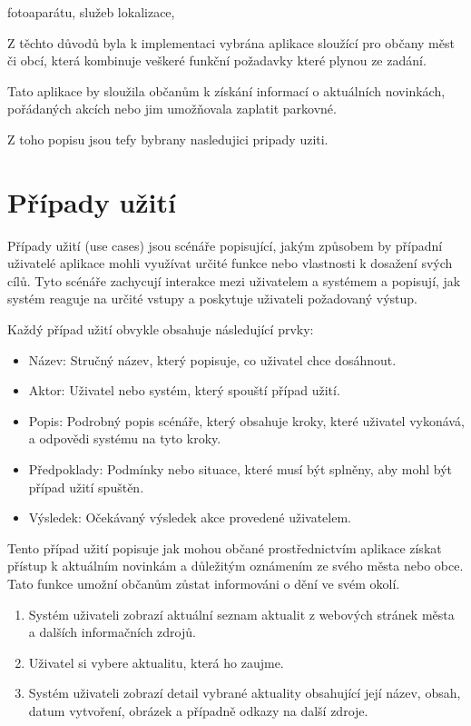 fotoaparátu, služeb lokalizace, 

Z těchto důvodů byla k implementaci vybrána aplikace sloužící pro občany měst či obcí, která kombinuje veškeré funkční
požadavky které plynou ze zadání.

Tato aplikace by sloužila občanům k získání informací o aktuálních novinkách, pořádaných akcích nebo jim umožňovala
zaplatit parkovné.

Z toho popisu jsou tefy bybrany nasledujici pripady uziti.

\section{Případy užití}
Případy užití (use cases) jsou scénáře popisující, jakým způsobem by případní uživatelé aplikace mohli využívat určité funkce nebo
vlastnosti k dosažení svých cílů. Tyto scénáře zachycují interakce mezi uživatelem a systémem a popisují, jak systém reaguje na určité vstupy a poskytuje 
uživateli požadovaný výstup.

Každý případ užití obvykle obsahuje následující prvky:

\begin{itemize}
  \item Název: Stručný název, který popisuje, co uživatel chce dosáhnout.
  \item Aktor: Uživatel nebo systém, který spouští případ užití.
  \item Popis: Podrobný popis scénáře, který obsahuje kroky, které uživatel vykonává, a odpovědi systému na tyto kroky.
  \item Předpoklady: Podmínky nebo situace, které musí být splněny, aby mohl být případ užití spuštěn.
  \item Výsledek: Očekávaný výsledek akce provedené uživatelem.
\end{itemize}

Tento případ užití popisuje jak mohou občané prostřednictvím aplikace získat přístup k aktuálním novinkám a důležitým oznámením ze svého města 
nebo obce. Tato funkce umožní občanům zůstat informováni o dění ve svém okolí.

\begin{enumerate}
  \item Systém uživateli zobrazí aktuální seznam aktualit z webových stránek města a dalších informačních zdrojů.
  \item Uživatel si vybere aktualitu, která ho zaujme.
  \item Systém uživateli zobrazí detail vybrané aktuality obsahující její název, obsah, datum vytvoření, obrázek a případně odkazy na další zdroje.
\end{enumerate}

